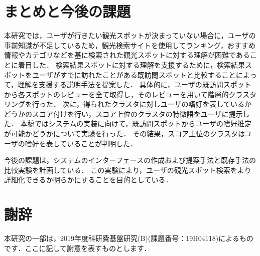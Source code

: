 \documentclass{deimj}
\begin{document}


\section{まとめと今後の課題}
\label{sec:まとめと今後の課題}

本研究では，ユーザが行きたい観光スポットが決まっていない場合に，ユーザの事前知識が不足しているため，観光検索サイトを使用してランキング，おすすめ情報やカテゴリなどを基に検索された観光スポットに対する理解が困難であることに着目した．
検索結果スポットに対する理解を支援するために，検索結果スポットをユーザがすでに訪れたことがある既訪問スポットと比較することによって，理解を支援する説明手法を提案した．
具体的に，ユーザの既訪問スポットから各スポットのレビューを全て取得し，そのレビューを用いて階層的クラスタリングを行った．
次に，得られたクラスタに対しユーザの嗜好を表しているかどうかのスコア付けを行い，スコア上位のクラスタの特徴語をユーザに提示した．
本稿ではシステムの実装に向けて，既訪問スポットからユーザの嗜好推定が可能かどうかについて実験を行った．
その結果，スコア上位のクラスタはユーザの嗜好を表していることが判明した．

今後の課題は，システムのインターフェースの作成および提案手法と既存手法の比較実験を計画している．
この実験により，ユーザの観光スポット検索をより詳細化できるか明らかにすることを目的としている．

\section*{謝辞}
本研究の一部は，2019年度科研費基盤研究(B)(課題番号：19H04118)によるものです．ここに記して謝意を表すものとします．
\end{document}
